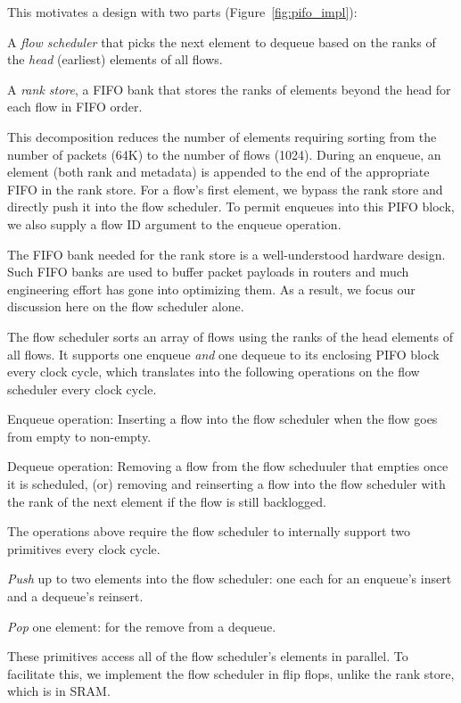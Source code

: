 This motivates a design with two parts (Figure~\ref{fig:pifo_impl}):
\begin{CompactEnumerate}
\item A {\em flow scheduler} that picks the next element to dequeue based on
the ranks of the {\em head} (earliest) elements of all flows. 
\item A {\em rank store}, a FIFO bank that stores the ranks of elements beyond
the head for each flow in FIFO order.
\end{CompactEnumerate}

This decomposition reduces the number of elements requiring sorting from the
number of packets (64K) to the number of flows (1024). During an enqueue, an
element (both rank and metadata) is appended to the end of the appropriate FIFO
in the rank store. For a flow's first element, we bypass the rank store and
directly push it into the flow scheduler. To permit enqueues into this PIFO
block, we also supply a flow ID argument to the enqueue operation.

The FIFO bank needed for the rank store is a well-understood hardware design.
Such FIFO banks are used to buffer packet payloads in routers and much
engineering effort has gone into optimizing them.  As a result, we focus our
discussion here on the flow scheduler alone.

The flow scheduler sorts an array of flows using the ranks of the head elements
of all flows. It supports one enqueue {\em and} one dequeue to its enclosing
PIFO block every clock cycle, which translates into the following operations on
the flow scheduler every clock cycle.
\begin{CompactEnumerate}
  \item Enqueue operation: Inserting a flow into the flow scheduler 
  when the flow goes from empty to non-empty.
\item Dequeue operation: Removing a flow from the flow scheduuler that
  empties once it is scheduled, (or) removing and reinserting a flow into
  the flow scheduler with the rank of the
  next element if the flow is still backlogged.
\end{CompactEnumerate}

The operations above require the flow scheduler to internally support two
primitives every clock cycle.
\begin{CompactEnumerate}
\item {\em Push} up to two elements into the flow scheduler: one each for an
  enqueue's insert and a dequeue's reinsert.
\item {\em Pop} one element: for the remove from a dequeue.
\end{CompactEnumerate}
These primitives access all of the flow scheduler's elements in parallel. To
facilitate this, we implement the flow scheduler in flip flops, unlike the rank
store, which is in SRAM.

